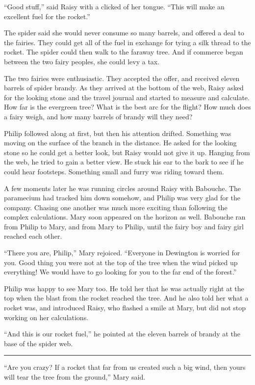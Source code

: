 \documentclass[10pt, draft]{memoir}
\renewcommand{\pfbreakdisplay}{\bigskip \ding{166} \bigskip}
\newcommand{\secbreak}{\fancybreak{\pfbreakdisplay}}
\begin{document}
``Good stuff,'' said Raisy with a clicked of her tongue. ``This will make an
excellent fuel for the rocket.''

The spider said she would never consume so many barrels, and offered a deal to
the fairies. They could get all of the fuel in exchange for tying a silk thread
to the rocket. The spider could then walk to the faraway tree. And if commerce
began between the two fairy peoples, she could levy a tax.

The two fairies were enthusiastic. They accepted the offer, and received eleven
barrels of spider brandy. As they arrived at the bottom of the web, Raisy asked
for the looking stone and the travel journal and started to measure and
calculate. How far is the evergreen tree? What is the best arc for the flight?
How much does a fairy weigh, and how many barrels of brandy will they need?

Philip followed along at first, but then his attention drifted. Something was
moving on the surface of the branch in the distance. He asked for the looking
stone so he could get a better look, but Raisy would not give it up. Hanging
from the web, he tried to gain a better view. He stuck his ear to the bark to
see if he could hear footsteps. Something small and furry was riding toward
them.

A few moments later he was running circles around Raisy with Babouche. The
paramecium had tracked him down somehow, and Philip was very glad for the
company. Chasing one another was much more exciting than following the complex
calculations. Mary soon appeared on the horizon as well. Babouche ran from
Philip to Mary, and from Mary to Philip, until the fairy boy and fairy girl
reached each other.

``There you are, Philip,'' Mary rejoiced. ``Everyone in Dewington is worried
for you. Good thing you were not at the top of the tree when the wind picked up
everything! We would have to go looking for you to the far end of the forest.''

Philip was happy to see Mary too. He told her that he was actually right at the
top when the blast from the rocket reached the tree. And he also told her what
a rocket was, and introduced Raisy, who flashed a smile at Mary, but did not
stop working on her calculations.

``And this is our rocket fuel,'' he pointed at the eleven barrels of brandy at
the base of the spider web.

\secbreak

``Are you crazy? If a rocket that far from us created such a big wind, then
yours will tear the tree from the ground,'' Mary said.
\end{document}
